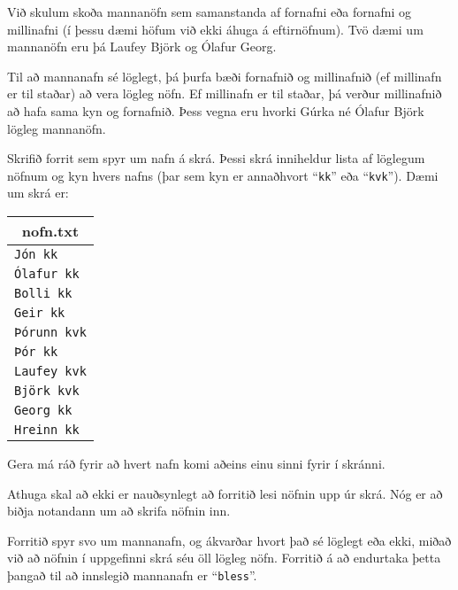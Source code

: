 \begin{problem}
	Við skulum skoða mannanöfn sem samanstanda af fornafni eða fornafni og millinafni (í þessu dæmi höfum við ekki áhuga á eftirnöfnum). Tvö dæmi um mannanöfn eru þá Laufey Björk og Ólafur Georg.

	Til að mannanafn sé löglegt, þá þurfa bæði fornafnið og millinafnið (ef millinafn er til staðar) að vera lögleg nöfn. Ef millinafn er til staðar, þá verður millinafnið að hafa sama kyn og fornafnið. Þess vegna eru hvorki Gúrka né Ólafur Björk lögleg mannanöfn.

	Skrifið forrit sem spyr um nafn á skrá. Þessi skrá inniheldur lista af löglegum nöfnum og kyn hvers nafns (þar sem kyn er annaðhvort "`\texttt{kk}"' eða "`\texttt{kvk}"'). Dæmi um skrá er:

\begin{center}
\begin{tabular}{|l|}
\hline
\multicolumn{1}{|c|}{\textbf{nofn.txt}}\\
\hline
\texttt{Jón kk}\\
\texttt{Ólafur kk}\\
\texttt{Bolli kk}\\
\texttt{Geir kk}\\
\texttt{Þórunn kvk}\\
\texttt{Þór kk}\\
\texttt{Laufey kvk}\\
\texttt{Björk kvk}\\
\texttt{Georg kk}\\
\texttt{Hreinn kk}\\
\hline
\end{tabular}
\end{center}

	Gera má ráð fyrir að hvert nafn komi aðeins einu sinni fyrir í skránni.

	Athuga skal að ekki er nauðsynlegt að forritið lesi nöfnin upp úr skrá. Nóg er að biðja notandann um að skrifa nöfnin inn.
	
	Forritið spyr svo um mannanafn, og ákvarðar hvort það sé löglegt eða ekki, miðað við að nöfnin í uppgefinni skrá séu öll lögleg nöfn. Forritið á að endurtaka þetta þangað til að innslegið mannanafn er "`\texttt{bless}"'.

\begin{example}
%
\end{example}
\end{problem}